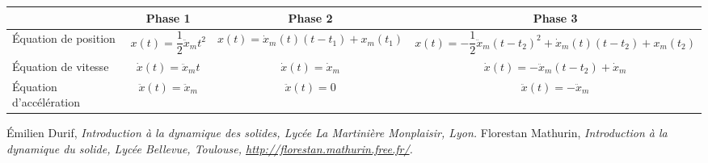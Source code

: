 \begin{center}
\begin{tabular}{|p{2.2cm}|c|c|c|}
\hline
 & Phase 1 & Phase 2 & Phase 3 \\
\hline \hline
Équation de position & 
$x(t)=\dfrac{1}{2}\ddot{x}_mt^2 $ &
$x(t)= \dot{x}_m(t)\left( t-t_1\right)+x_m\left(t_1 \right)$ & 
$x(t)= -\dfrac{1}{2}\ddot{x}_m\left(t-t_2\right)^2 + \dot{x}_m(t)\left( t-t_2\right)+x_m\left(t_2\right)$ \\ \hline
Équation de vitesse &
$\dot{x}(t)=\ddot{x}_m t$ &  
$\dot{x}(t)=\dot{x}_m $ & 
$\dot{x}(t)=-\ddot{x}_m \left(t-t_2\right)+\dot{x}_m$  \\ \hline
Équation d'accélération &
$\ddot{x}(t)=\ddot{x}_m$ & 
$\ddot{x}(t)=0$ & 
$\ddot{x}(t)=-\ddot{x}_m$ \\
\hline
\end{tabular}
\end{center}

\begin{thebibliography}{2}
    Émilien Durif, {\it Introduction à la dynamique des solides, Lycée La Martinière Monplaisir, Lyon.}
    Florestan Mathurin, {\it Introduction à la dynamique du solide, Lycée Bellevue, Toulouse, \url{http://florestan.mathurin.free.fr/}.}
\end{thebibliography}

%
